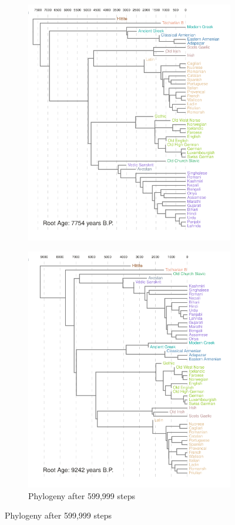 \documentclass[10pt,journal,compsoc]{IEEEtran}
\begin{document}
\begin{figure}
\begin{subfigure}[b]{0.4\paperwidth}
         \includegraphics[width=\textwidth]{runs26-conv2}
         \label{fig:three sin x}
     \end{subfigure}
     \newline
     \begin{subfigure}[b]{0.4\paperwidth}
         \centering
         \caption{Phylogeny after 599,999 steps}
         \includegraphics[width=\textwidth]{runs26-conv3}

\end{subfigure}
\end{figure}
\end{document}
